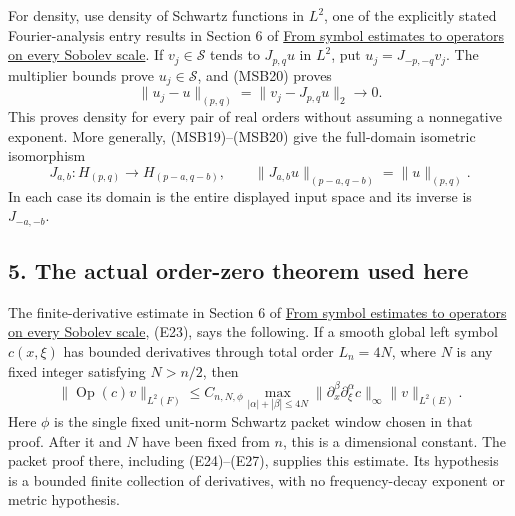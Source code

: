 \documentclass[
  11pt,
]{article}
\makeatletter
\let\ReaderOriginalAnchorStart\hyper@anchorstart
\let\ReaderOriginalAnchorEnd\hyper@anchorend
\let\ReaderPendingAliases\@empty
\def\ReaderArmAliases#1{\gdef\ReaderPendingAliases{#1}}
\def\hyper@anchorstart#1{\ReaderIfNativeAnchorTF{#1}{\ReaderPendingAliases\global\let\ReaderPendingAliases\@empty}{}\ReaderOriginalAnchorStart{#1}}
\makeatother
\begin{document}
For density, use density of Schwartz functions in \(L^2\), one of the
explicitly stated Fourier-analysis entry results in Section 6 of
\href{euclidean-symbol-calculus.pdf}{From symbol estimates to operators
on every Sobolev scale}. If \(v_j\in\mathcal S\) tends to \(J_{p,q}u\)
in \(L^2\), put \(u_j=J_{-p,-q}v_j\). The multiplier bounds prove
\(u_j\in\mathcal S\), and (MSB20) proves \[
 \|u_j-u\|_{(p,q)}=\|v_j-J_{p,q}u\|_2\longrightarrow0.
 \tag{MSB23}
\] This proves density for every pair of real orders without assuming a
nonnegative exponent. More generally, (MSB19)--(MSB20) give the
full-domain isometric isomorphism \[
 J_{a,b}:H_{(p,q)}\longrightarrow H_{(p-a,q-b)},
 \qquad\|J_{a,b}u\|_{(p-a,q-b)}=\|u\|_{(p,q)}.
 \tag{MSB24}
\] In each case its domain is the entire displayed input space and its
inverse is \(J_{-a,-b}\).

\ReaderArmAliases{\ReaderOriginalAnchorStart{AN03-MSB-005}\ReaderOriginalAnchorEnd\begingroup\expandafter\def\csname @currentHref\endcsname{AN03-MSB-005}\label{AN03-MSB-005}\endgroup\ReaderOriginalAnchorStart{an03-msb-005-the-actual-order-zero-theorem-used-here}\ReaderOriginalAnchorEnd\begingroup\expandafter\def\csname @currentHref\endcsname{an03-msb-005-the-actual-order-zero-theorem-used-here}\label{an03-msb-005-the-actual-order-zero-theorem-used-here}\endgroup\ReaderOriginalAnchorStart{5-the-actual-order-zero-theorem-used-here}\ReaderOriginalAnchorEnd\begingroup\expandafter\def\csname @currentHref\endcsname{5-the-actual-order-zero-theorem-used-here}\label{5-the-actual-order-zero-theorem-used-here}\endgroup}
\subsection{5. The actual order-zero theorem used
here}\label{the-actual-order-zero-theorem-used-here}

The finite-derivative estimate in Section 6 of
\href{euclidean-symbol-calculus.pdf}{From symbol estimates to operators
on every Sobolev scale}, (E23), says the following. If a smooth global
left symbol \(c(x,\xi)\) has bounded derivatives through total order
\(L_n=4N\), where \(N\) is any fixed integer satisfying \(N>n/2\), then
\[
 \|\operatorname{Op}(c)v\|_{L^2(F)}
 \leq C_{n,N,\phi}
 \max_{|\alpha|+|\beta|\leq4N}
       \|\partial_x^\beta\partial_\xi^\alpha c\|_\infty
       \|v\|_{L^2(E)}.
 \tag{MSB25}
\] Here \(\phi\) is the single fixed unit-norm Schwartz packet window
chosen in that proof. After it and \(N\) have been fixed from \(n\),
this is a dimensional constant. The packet proof there, including
(E24)--(E27), supplies this estimate. Its hypothesis is a bounded finite
collection of derivatives, with no frequency-decay exponent or metric
hypothesis.
\end{document}
